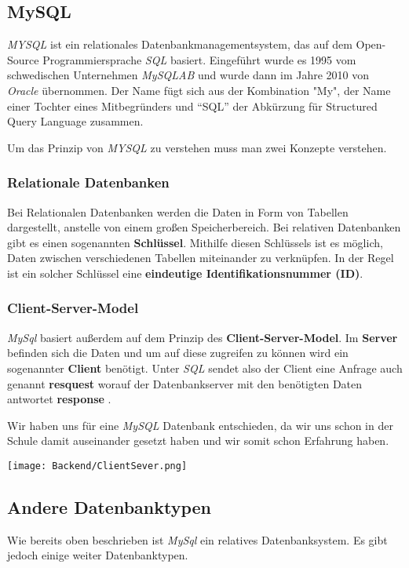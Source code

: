 \subsection{MySQL}

\textit{MYSQL} ist ein relationales Datenbankmanagementsystem, das auf dem Open-Source
Programmiersprache \textit{SQL} basiert. Eingeführt wurde es 1995 vom schwedischen Unternehmen
\textit{MySQLAB} und wurde dann im Jahre 2010 von \textit{Oracle} übernommen. Der Name fügt sich
aus der Kombination "My", der Name einer Tochter eines Mitbegründers und ``SQL'' der Abkürzung
für Structured Query Language zusammen.

Um das Prinzip von \textit{MYSQL} zu verstehen muss man zwei Konzepte verstehen.

\subsubsection{Relationale Datenbanken}
Bei Relationalen Datenbanken werden die Daten in Form von Tabellen dargestellt, anstelle von
einem großen Speicherbereich.
Bei relativen Datenbanken gibt es einen sogenannten \textbf{Schlüssel}. Mithilfe diesen Schlüssels
ist es möglich, Daten zwischen verschiedenen Tabellen miteinander zu verknüpfen. In der Regel ist
ein solcher Schlüssel eine \textbf{eindeutige Identifikationsnummer (ID)}.
\subsubsection{Client-Server-Model}
\textit{MySql} basiert außerdem auf dem Prinzip des \textbf{Client-Server-Model}. Im \textbf{Server}
befinden sich die Daten und um auf diese zugreifen zu können wird ein sogenannter \textbf{Client}
benötigt. Unter \textit{SQL} sendet also der Client eine Anfrage auch genannt \textbf{resquest}
worauf der Datenbankserver mit den benötigten Daten antwortet \textbf{response} .

Wir haben uns für eine \textit{MySQL} Datenbank entschieden, da wir uns schon in der Schule
damit auseinander gesetzt haben und wir somit schon Erfahrung haben.

\texttt{[image: Backend/ClientSever.png]}


\subsection{Andere Datenbanktypen}
Wie bereits oben beschrieben ist \textit{MySql} ein relatives Datenbanksystem. Es gibt
jedoch einige weiter Datenbanktypen.

